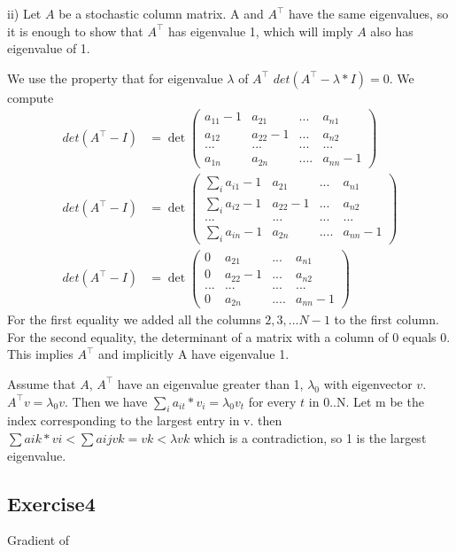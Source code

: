 \documentclass{article} %
\begin{document}
ii) Let $A$  be a stochastic column matrix. A and $A^\top$ have the same eigenvalues, so it is enough to show that $A^\top$ has eigenvalue 1, which will imply $A$ also has eigenvalue of 1.

We use the property that for eigenvalue $\lambda$ of $A^\top$
$det(A^\top - \lambda* I) = 0$.
We compute 
\begin{align}
det(A^\top - I) & = \det \begin{pmatrix}
    a_{11} - 1 & a_{21} & ... & a_{n1}\\
    a_{12}    &  a_{22} - 1& ... & a_{n2}\\
    ...& ... & ...& ... \\
    a_{1n} & a_{2n} & ....& a_{nn} - 1
\end{pmatrix}  
\\
det(A^\top - I) & = \det \begin{pmatrix}
    \sum_{i} a_{i1} - 1 & a_{21} & ... & a_{n1}\\
    \sum_{i} a_{i2}  - 1   &  a_{22} - 1& ... & a_{n2}\\
    ...& ... & ...& ... \\
    \sum_{i} a_{in}  - 1& a_{2n} & ....& a_{nn} - 1
   \end{pmatrix}  
 \\
 det(A^\top - I) & = \det \begin{pmatrix}
    0 & a_{21} & ... & a_{n1}\\
    0  &  a_{22} - 1& ... & a_{n2}\\
    ...& ... & ...& ... \\
    0 & a_{2n} & ....& a_{nn} - 1
\end{pmatrix}  
\end{align}
For the first equality we added all the columns $2, 3, ...N-1$ to the first column. For the second equality, the determinant of a matrix with a column of 0 equals 0. This implies $A^\top$ and implicitly A have eigenvalue 1.

Assume that $A$, $A^\top$ have an eigenvalue greater than 1, $\lambda_{0}$ with eigenvector $v$.
$A^\top v = \lambda_{0} v$. Then we have 
$ \sum_{i} a_{it}*v_{i} = \lambda_{0} v_{t}$ for every $t$ in 0..N. Let m be the index corresponding to the largest
entry in v. then $ \sum aik*vi < \sum aij vk = vk <\lambda vk$ 
which is a contradiction, so 1 is the largest eigenvalue.

\subsection{Exercise4}
Gradient of 
\end{document}
